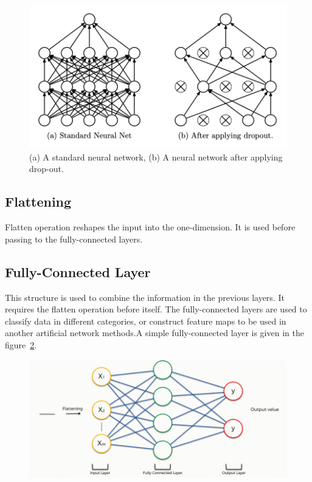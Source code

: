 \begin{figure}[h]
    \centering
    \includegraphics[width=.8\linewidth]{fig/dropout.png}
    \caption{(a) A standard neural network, (b) A neural network after applying drop-out\cite{dropout_article}.}
    \label{fig:dropout}
\end{figure}

\subsection{Flattening}

Flatten operation reshapes the input into the one-dimension. It is used before passing to the fully-connected layers.

\subsection{Fully-Connected Layer}

This structure is used to combine the information in the previous layers. It requires the flatten operation before itself. The fully-connected layers are used to classify data in different categories, or construct feature maps to be used in another artificial network methods.A simple fully-connected layer is given in the figure~\ref{fig:fully_connected_layer}.

\begin{figure}[h]
    \centering
    \includegraphics[width=\linewidth]{fig/fully_connected_layer.png}
	\vspace*{1mm}
    \label{fig:fully_connected_layer}
\end{figure}

